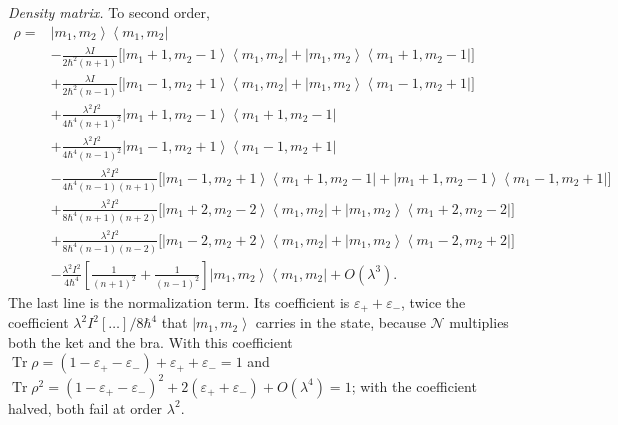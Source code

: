\documentclass[aps,preprint,12pt,superscriptaddress,nofootinbib]{revtex4-2}
\newcommand{\Tr}{\operatorname{Tr}}
\newcommand{\ket}[1]{\left|#1\right\rangle}
\newcommand{\ketbra}[2]{\left|#1\right\rangle\!\left\langle#2\right|}
\newcommand{\epsp}{\varepsilon_{+}}
\newcommand{\epsm}{\varepsilon_{-}}
\begin{document}
\emph{Density matrix.} To second order,
\begingroup\small
\begin{align}
\rho={}&\ketbra{m_{1},m_{2}}{m_{1},m_{2}}\nonumber\\
&-\frac{\lambda I}{2\hbar^{2}(n+1)}\Big[\ketbra{m_{1}+1,m_{2}-1}{m_{1},m_{2}}
+\ketbra{m_{1},m_{2}}{m_{1}+1,m_{2}-1}\Big]\nonumber\\
&+\frac{\lambda I}{2\hbar^{2}(n-1)}\Big[\ketbra{m_{1}-1,m_{2}+1}{m_{1},m_{2}}
+\ketbra{m_{1},m_{2}}{m_{1}-1,m_{2}+1}\Big]\nonumber\\
&+\frac{\lambda^{2}I^{2}}{4\hbar^{4}(n+1)^{2}}\ketbra{m_{1}+1,m_{2}-1}{m_{1}+1,m_{2}-1}
\nonumber\\
&+\frac{\lambda^{2}I^{2}}{4\hbar^{4}(n-1)^{2}}\ketbra{m_{1}-1,m_{2}+1}{m_{1}-1,m_{2}+1}
\nonumber\\
&-\frac{\lambda^{2}I^{2}}{4\hbar^{4}(n-1)(n+1)}\Big[\ketbra{m_{1}-1,m_{2}+1}{m_{1}+1,m_{2}-1}
+\ketbra{m_{1}+1,m_{2}-1}{m_{1}-1,m_{2}+1}\Big]\nonumber\\
&+\frac{\lambda^{2}I^{2}}{8\hbar^{4}(n+1)(n+2)}\Big[\ketbra{m_{1}+2,m_{2}-2}{m_{1},m_{2}}
+\ketbra{m_{1},m_{2}}{m_{1}+2,m_{2}-2}\Big]\nonumber\\
&+\frac{\lambda^{2}I^{2}}{8\hbar^{4}(n-1)(n-2)}\Big[\ketbra{m_{1}-2,m_{2}+2}{m_{1},m_{2}}
+\ketbra{m_{1},m_{2}}{m_{1}-2,m_{2}+2}\Big]\nonumber\\
&-\frac{\lambda^{2}I^{2}}{4\hbar^{4}}\left[\frac{1}{(n+1)^{2}}+\frac{1}{(n-1)^{2}}\right]
\ketbra{m_{1},m_{2}}{m_{1},m_{2}}+O(\lambda^{3}).
\label{eq:rhofull}
\end{align}
\endgroup
The last line is the normalization term. Its coefficient is
$\epsp+\epsm$, twice the coefficient $\lambda^{2}I^{2}[\dots]/8\hbar^{4}$ that
$\ket{m_{1},m_{2}}$ carries in the state, because $\mathcal{N}$ multiplies both the ket
and the bra. With this coefficient $\Tr\rho=(1-\epsp-\epsm)+\epsp+\epsm=1$ and
$\Tr\rho^{2}=(1-\epsp-\epsm)^{2}+2(\epsp+\epsm)+O(\lambda^{4})=1$; with the
coefficient halved, both fail at order $\lambda^{2}$.
\end{document}
